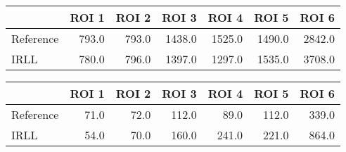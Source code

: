 \begin{tabular}{lrrrrrr}
\toprule
{} &  ROI 1 &  ROI 2 &   ROI 3 &   ROI 4 &   ROI 5 &   ROI 6 \\
\midrule
Reference &  793.0 &  793.0 &  1438.0 &  1525.0 &  1490.0 &  2842.0 \\
IRLL      &  780.0 &  796.0 &  1397.0 &  1297.0 &  1535.0 &  3708.0 \\
\bottomrule
\end{tabular}
\begin{tabular}{lrrrrrr}
\toprule
{} &  ROI 1 &  ROI 2 &  ROI 3 &  ROI 4 &  ROI 5 &  ROI 6 \\
\midrule
Reference &   71.0 &   72.0 &  112.0 &   89.0 &  112.0 &  339.0 \\
IRLL      &   54.0 &   70.0 &  160.0 &  241.0 &  221.0 &  864.0 \\
\bottomrule
\end{tabular}
